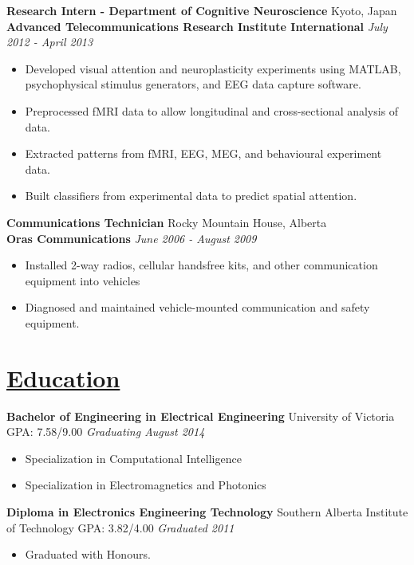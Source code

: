 \documentclass[a4paper, 11pt]{article}
\begin{document}
  \textbf{Research Intern - Department of Cognitive Neuroscience}
  \hfill
  Kyoto, Japan\\
  \textbf{Advanced Telecommunications Research Institute International}
  \hfill
  \emph{July 2012 - April 2013}
  \begin{itemize}[nosep]
    \item Developed visual attention and neuroplasticity experiments using MATLAB, psychophysical stimulus generators, and EEG data capture software.
    \item Preprocessed fMRI data to allow longitudinal and cross-sectional analysis of data.
    \item Extracted patterns from fMRI, EEG, MEG, and behavioural experiment data.
    \item Built classifiers from experimental data to predict spatial attention.
  \end{itemize}
  \medskip

  \textbf{Communications Technician}
  \hfill
  Rocky Mountain House, Alberta \\
  \textbf{Oras Communications}
  \hfill
  \emph{June 2006 - August 2009}
  \begin{itemize}[nosep]
  \item Installed 2-way radios, cellular handsfree kits, and other communication equipment into vehicles
  \item Diagnosed and maintained vehicle-mounted communication and safety equipment.
  \end{itemize}  

\newpage
\section{\underline{Education}}
  \textbf{Bachelor of Engineering in Electrical Engineering}
  \hfill
  University of Victoria\\
  GPA: 7.58/9.00
  \hfill
  \emph{Graduating August 2014}
  \begin{itemize}[nosep]
    \item Specialization in Computational Intelligence
    \item Specialization in Electromagnetics and Photonics
  \end{itemize}
  \medskip
  
  \textbf{Diploma in Electronics Engineering Technology}
  \hfill
  Southern Alberta Institute of Technology
  GPA: 3.82/4.00
  \hfill
  \emph{Graduated 2011}
  \begin{itemize}[nosep]
    \item Graduated with Honours.
  \end{itemize}
  \medskip
  
\end{document}
